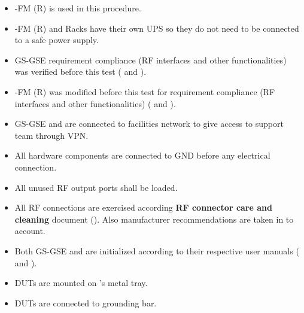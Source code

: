\begin{itemize}
\item \gse-FM (R) is used in this procedure.
 

\item \gse-FM (R) and \comEgse\xspace Racks have their own UPS so they do not need to be connected to a safe power supply. %

\item GS-GSE requirement compliance (RF interfaces and other functionalities) was verified before this test ( and ). 
\item \gse-FM (R) was modified before this test for requirement compliance
 (RF interfaces and other functionalities) ( and ).
\item GS-GSE and \comEgse\xspace are connected to facilities network to give access to support team through VPN. 



\item All hardware components are connected to GND before any electrical connection.

\item All unused RF output ports shall be loaded.

\item All RF connections are exercised according \textbf{RF connector care and cleaning} document 
(). Also manufacturer recommendations are taken in to account.

\item Both GS-GSE and \comEgse\xspace are initialized according to their respective user manuals ( and ).

\item DUTs are mounted on \comEgse's metal tray.

\item DUTs are connected to grounding bar.



\end{itemize}
